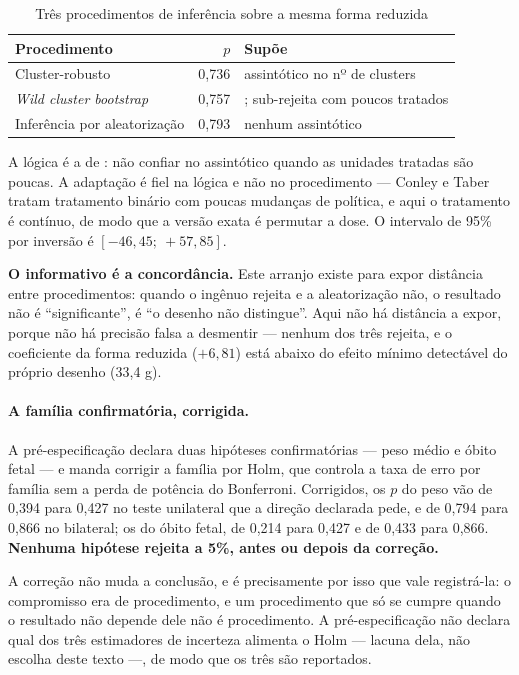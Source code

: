 \begin{table}[htbp]
\centering
\caption{Três procedimentos de inferência sobre a mesma forma reduzida}
\label{tab:inferencia}
\small
\begin{tabular}{lrl}
\toprule
\textbf{Procedimento} & \textbf{\(p\)} & \textbf{Supõe} \\
\midrule
Cluster-robusto           & 0,736 & assintótico no nº de clusters \\
\emph{Wild cluster bootstrap} & 0,757 & \citet{cameron2008wild}; sub-rejeita com poucos tratados \citep{canay2021wild} \\
Inferência por aleatorização & 0,793 & nenhum assintótico \\
\bottomrule
\end{tabular}
\end{table}

A lógica é a de \citet{conley2011}: não confiar no assintótico quando as
unidades tratadas são poucas. A adaptação é fiel na lógica e não no
procedimento --- Conley e Taber tratam tratamento binário com poucas mudanças de
política, e aqui o tratamento é contínuo, de modo que a versão exata é permutar
a dose. O intervalo de 95\% por inversão é \([-46{,}45;\ +57{,}85]\).

\textbf{O informativo é a concordância.} Este arranjo existe para expor
distância entre procedimentos: quando o ingênuo rejeita e a aleatorização não, o
resultado não é ``significante'', é ``o desenho não distingue''. Aqui não há
distância a expor, porque não há precisão falsa a desmentir --- nenhum dos três
rejeita, e o coeficiente da forma reduzida (\(+6{,}81\)) está abaixo do efeito
mínimo detectável do próprio desenho (33{,}4 g).

\paragraph{A família confirmatória, corrigida.}
A pré-especificação declara duas hipóteses confirmatórias --- peso médio e óbito
fetal --- e manda corrigir a família por Holm, que controla a taxa de erro por
família sem a perda de potência do Bonferroni. Corrigidos, os \(p\) do peso vão
de 0,394 para 0,427 no teste unilateral que a direção declarada pede, e de 0,794
para 0,866 no bilateral; os do óbito fetal, de 0,214 para 0,427 e de 0,433 para
0,866. \textbf{Nenhuma hipótese rejeita a 5\%, antes ou depois da correção.}

A correção não muda a conclusão, e é precisamente por isso que vale registrá-la:
o compromisso era de procedimento, e um procedimento que só se cumpre quando o
resultado não depende dele não é procedimento. A pré-especificação não declara
qual dos três estimadores de incerteza alimenta o Holm --- lacuna dela, não
escolha deste texto ---, de modo que os três são reportados.


